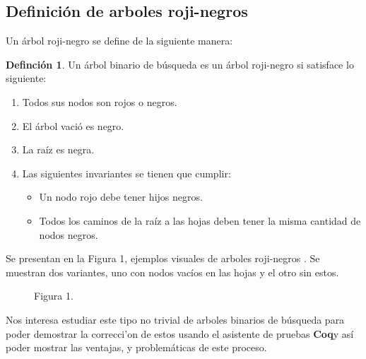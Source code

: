 \documentclass[letterpaper,12pt,oneside]{book}
\newcommand{\coq}{\textbf{Coq}}
\newcommand{\arn}{árbol roji-negro }
\newcommand{\arns}{arboles roji-negros }
\theoremstyle{plain}
\theoremstyle{definition}
\newtheorem{defn}{Definci\'on}[section]
\theoremstyle{remark}
\begin{document}
\subsection{Definici\'on de \arns}
Un \arn se define de la siguiente manera:
\begin{defn}
Un \'arbol binario de búsqueda es un \arn si satisface lo siguiente:
\begin{enumerate}
    \item Todos sus nodos son rojos o negros.
    \item El \'arbol vació es negro.
    \item La raíz es negra.
    \item Las siguientes invariantes se tienen que cumplir:
    \begin{itemize}
        \item Un nodo rojo debe tener hijos negros.
        \item Todos los caminos de la raíz a las hojas deben tener la misma cantidad de nodos negros.
    \end{itemize}
\end{enumerate}
\end{defn}
Se presentan en la Figura 1, ejemplos visuales de \arns. Se muestran dos variantes, uno con nodos vacíos en las hojas
y el otro sin estos.

\hspace*{5cm}
\begin{figure}
\label{arbolRB}
\centering Figura 1.
\end{figure}
Nos interesa estudiar este tipo no trivial de arboles binarios de búsqueda para poder
demostrar la correcci'on de estos usando el asistente de pruebas \coq y así poder mostrar las ventajas, 
y problemáticas de este proceso.
\end{document}
